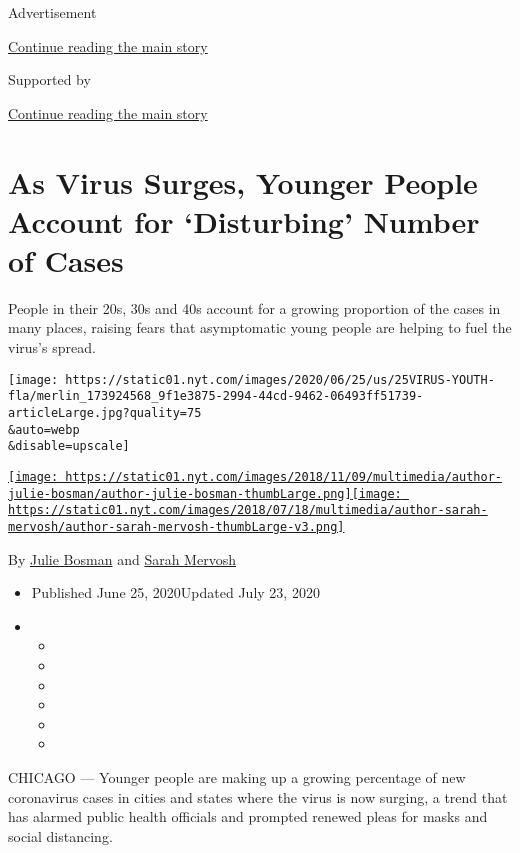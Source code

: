 Advertisement

\protect\hyperlink{after-top}{Continue reading the main story}

Supported by

\protect\hyperlink{after-sponsor}{Continue reading the main story}

\hypertarget{as-virus-surges-younger-people-account-for-disturbing-number-of-cases}{%
\section{As Virus Surges, Younger People Account for `Disturbing' Number
of
Cases}\label{as-virus-surges-younger-people-account-for-disturbing-number-of-cases}}

People in their 20s, 30s and 40s account for a growing proportion of the
cases in many places, raising fears that asymptomatic young people are
helping to fuel the virus's spread.

\texttt{[image: https://static01.nyt.com/images/2020/06/25/us/25VIRUS-YOUTH-fla/merlin\_173924568\_9f1e3875-2994-44cd-9462-06493ff51739-articleLarge.jpg?quality=75\\\&auto=webp\\\&disable=upscale]}

\href{https://www.nytimes.com/by/julie-bosman}{\texttt{[image: https://static01.nyt.com/images/2018/11/09/multimedia/author-julie-bosman/author-julie-bosman-thumbLarge.png]}}\href{https://www.nytimes.com/by/sarah-mervosh}{\texttt{[image: https://static01.nyt.com/images/2018/07/18/multimedia/author-sarah-mervosh/author-sarah-mervosh-thumbLarge-v3.png]}}

By \href{https://www.nytimes.com/by/julie-bosman}{Julie Bosman} and
\href{https://www.nytimes.com/by/sarah-mervosh}{Sarah Mervosh}

\begin{itemize}
\item
  Published June 25, 2020Updated July 23, 2020
\item
  \begin{itemize}
  \item
  \item
  \item
  \item
  \item
  \item
  \end{itemize}
\end{itemize}

CHICAGO --- Younger people are making up a growing percentage of new
coronavirus cases in cities and states where the virus is now surging, a
trend that has alarmed public health officials and prompted renewed
pleas for masks and social distancing.

